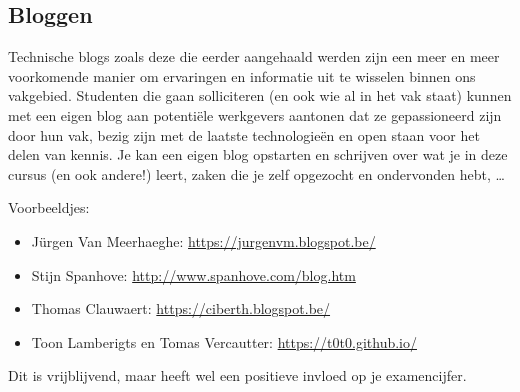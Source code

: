 \subsection{Bloggen}
\label{subs:bloggen}

Technische blogs zoals deze die eerder aangehaald werden zijn een meer en meer voorkomende manier om ervaringen en informatie uit te wisselen binnen ons vakgebied. Studenten die gaan solliciteren (en ook wie al in het vak staat) kunnen met een eigen blog aan potentiële werkgevers aantonen dat ze gepassioneerd zijn door hun vak, bezig zijn met de laatste technologieën en open staan voor het delen van kennis. Je kan een eigen blog opstarten en schrijven over wat je in deze cursus (en ook andere!) leert, zaken die je zelf opgezocht en ondervonden hebt, \ldots

Voorbeeldjes:

\begin{itemize}
\item Jürgen Van Meerhaeghe: \url{https://jurgenvm.blogspot.be/}
\item Stijn Spanhove: \url{http://www.spanhove.com/blog.htm}
\item Thomas Clauwaert: \url{https://ciberth.blogspot.be/}
\item Toon Lamberigts en Tomas Vercautter: \url{https://t0t0.github.io/}
\end{itemize}

Dit is vrijblijvend, maar heeft wel een positieve invloed op je examencijfer.

